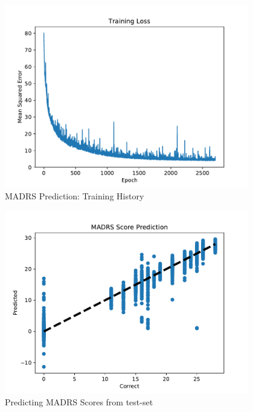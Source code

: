 \begin{figure}
\begin{center}
      \includegraphics[height=8cm]{img/madrs_prediction/train_history.pdf}
      \caption{MADRS Prediction: Training History}
      \label{figure:madrs_prediction_history}
\end{center}
\end{figure}

\begin{figure}
\begin{center}
      \includegraphics[height=8cm]{img/madrs_prediction/predictions.pdf}
      \caption{Predicting MADRS Scores from test-set}
      \label{figure:madrs_prediction_testset}
\end{center}
\end{figure}

